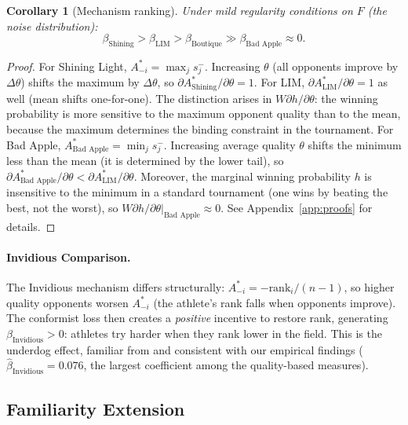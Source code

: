 \documentclass[12pt]{article}
\newtheorem{corollary}{Corollary}
\theoremstyle{definition}
\theoremstyle{remark}
\begin{document}
\begin{corollary}[Mechanism ranking]
\label{cor:ranking}
Under mild regularity conditions on $F$ (the noise distribution):
\begin{equation}
\beta_{\text{Shining}} > \beta_{\text{LIM}} > \beta_{\text{Boutique}} \gg \beta_{\text{Bad Apple}} \approx 0.
\end{equation}
\end{corollary}

\begin{proof}
For Shining Light, $A_{-i}^* = \max_j s_j^-$.
Increasing $\theta$ (all opponents improve by $\Delta\theta$) shifts the maximum by $\Delta\theta$,
so $\partial A_{\text{Shining}}^*/\partial\theta = 1$.
For LIM, $\partial A_{\text{LIM}}^*/\partial\theta = 1$ as well (mean shifts one-for-one).
The distinction arises in $W\partial h/\partial\theta$:
the winning probability is more sensitive to the maximum opponent quality than to the mean,
because the maximum determines the binding constraint in the tournament.
For Bad Apple, $A_{\text{Bad Apple}}^* = \min_j s_j^-$.
Increasing average quality $\theta$ shifts the minimum less than the mean (it is determined
by the lower tail), so $\partial A_{\text{Bad Apple}}^*/\partial\theta < \partial A_{\text{LIM}}^*/\partial\theta$.
Moreover, the marginal winning probability $h$ is insensitive to the minimum in
a standard tournament (one wins by beating the best, not the worst),
so $W\partial h/\partial\theta|_{\text{Bad Apple}} \approx 0$.
See Appendix~\ref{app:proofs} for details.
\end{proof}

\paragraph{Invidious Comparison.}
The Invidious mechanism differs structurally: $A_{-i}^* = -\text{rank}_i/(n-1)$,
so higher quality opponents worsen $A_{-i}^*$ (the athlete's rank falls when
opponents improve).
The conformist loss then creates a \textit{positive} incentive to restore rank,
generating $\beta_{\text{Invidious}} > 0$: athletes try harder when they rank lower
in the field.
This is the underdog effect, familiar from \citet{GenakosPageliero2012} and
consistent with our empirical findings ($\hat\beta_{\text{Invidious}} = 0.076$,
the largest coefficient among the quality-based measures).

\subsection{Familiarity Extension}
\label{subsec:fam_ext}
\end{document}
